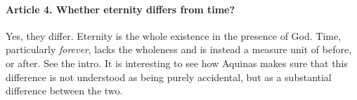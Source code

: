 \documentclass{ucetd}
\begin{document}
\paragraph{Article 4. Whether eternity differs from time?}
Yes, they differ. Eternity is the whole existence in the presence of God. Time, particularly \textit{forever}, lacks the wholeness and is instead a measure unit of before, or after. See the intro. It is interesting to see how Aquinas makes sure that this difference is not understood as being purely accidental, but as a substantial difference between the two.
\end{document}
